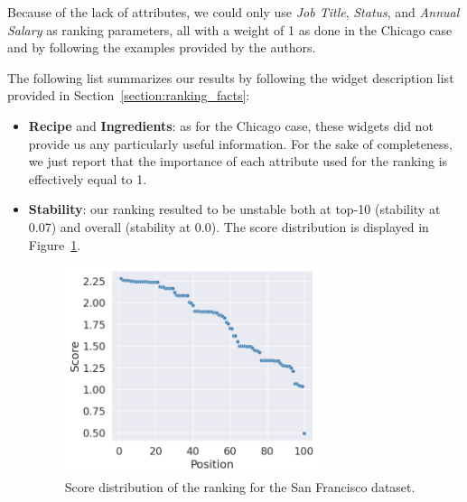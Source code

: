 Because of the lack of attributes, we could only use \textit{Job Title}, \textit{Status}, and \textit{Annual Salary} as ranking parameters, all with a weight of 1 as done in the Chicago case and by following the examples provided by the authors.

The following list summarizes our results by following the widget description list provided in Section~\ref{section:ranking_facts}:
\begin{itemize}
\item \textbf{Recipe} and \textbf{Ingredients}: as for the Chicago case, these widgets did not provide us any particularly useful information. For the sake of completeness, we just report that the importance of each attribute used for the ranking is effectively equal to 1.
\item \textbf{Stability}: our ranking resulted to be unstable both at top-10 (stability at 0.07) and overall (stability at 0.0). The score distribution is displayed in Figure~\ref{fig:san_francisco_rankingfacts2}.

\begin{figure}[t!]
\centering
\includegraphics[width=0.7\textwidth]{figures/san_francisco_rankingfacts2.png}
\caption{Score distribution of the ranking for the San Francisco dataset.}
\label{fig:san_francisco_rankingfacts2}
\end{figure}


\end{itemize}
